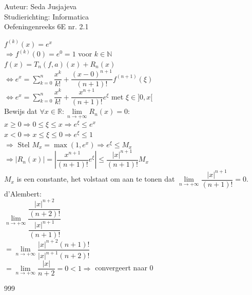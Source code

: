 \documentclass[a4paper]{article}
\newcommand{\limit}{\lim\limits}
\begin{document}
\noindent \large Auteur: Seda Jusjajeva\\
\noindent \large Studierichting: Informatica\\
\noindent \large Oefeningenreeks 6E nr. 2.1\\

\medskip

\normalsize


$f^{(k)}(x) = e^x$ \\

$\Rightarrow f^{(k)}(0) = e^0 = 1$ voor $k \in \mathbb{N}$ \\

$f(x) = T_n(f,a)(x) + R_n(x)$ \\

$\Leftrightarrow e^x = \displaystyle\sum_{k = 0}^n \dfrac{x^k}{k!} + \dfrac{(x - 0)^{n + 1}}{(n + 1)!}f^{(n + 1)}(\xi)$ \\

$\Leftrightarrow e^x = \displaystyle\sum_{k = 0}^n \dfrac{x^k}{k!} + \dfrac{x^{n + 1}}{(n + 1)!}e^\xi$ met $\xi \in ]0,x[$ \\

Bewijs dat $\forall x \in \mathbb{R}: \limit_{n \to +\infty} R_n(x) = 0$: \\

$x\ge0 \Rightarrow 0\le\xi\le x \Rightarrow e^\xi\le e^x$ \\

$x < 0 \Rightarrow x\le\xi\le0 \Rightarrow e^\xi\le1$ \\

$\Rightarrow$ Stel $M_x = \max(1,e^x) \Rightarrow e^\xi\le M_x$ \\

$\Rightarrow \left|R_n(x)\right| = \left|\dfrac{x^{n + 1}}{(n + 1)!}e^\xi\right| \le \dfrac{|x|^{n + 1}}{(n + 1)!}M_x$ \\

$M_x$ is een constante, het volstaat om aan te tonen dat $\limit_{n \to +\infty} \dfrac{|x|^{n + 1}}{(n + 1)!} = 0$. \\

d'Alembert: \\

$\limit_{n \to +\infty}\dfrac{\dfrac{|x|^{n + 2}}{(n + 2)!}}{\dfrac{|x|^{n + 1}}{(n + 1)!}}$ \\

$= \limit_{n \to +\infty}\dfrac{|x|^{n + 2}(n + 1)!}{|x|^{n + 1}(n + 2)!}$ \\

$= \limit_{n \to +\infty}\dfrac{|x|}{n + 2} = 0 < 1 \Rightarrow$ convergeert naar 0\\


\begin{thebibliography}{999}
\end{thebibliography}
\end{document}
